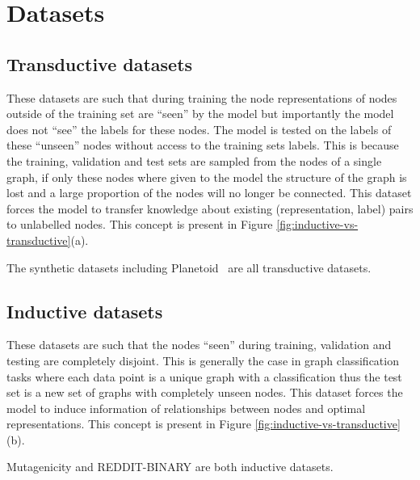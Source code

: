 \chapter{Datasets}
\label{app:datasets}


\section{Transductive datasets}
These datasets are such that during training the node representations of nodes outside of the training set are ``seen'' by the model but importantly the model does not ``see'' the labels for these nodes.
The model is tested on the labels of these ``unseen'' nodes without access to the training sets labels.
This is because the training, validation and test sets are sampled from the nodes of a single graph, if only these nodes where given to the model the structure of the graph is lost and a large proportion of the nodes will no longer be connected.
This dataset forces the model to transfer knowledge about existing (representation, label) pairs to unlabelled nodes.
This concept is present in Figure \ref{fig:inductive-vs-transductive}(a).

The synthetic datasets including Planetoid~\cite{planetoid} are all transductive datasets.

\section{Inductive datasets}
These datasets are such that the nodes ``seen'' during training, validation and testing are completely disjoint.
This is generally the case in graph classification tasks where each data point is a unique graph with a classification thus the test set is a new set of graphs with completely unseen nodes.
This dataset forces the model to induce information of relationships between nodes and optimal representations.
This concept is present in Figure \ref{fig:inductive-vs-transductive}(b).

Mutagenicity and REDDIT-BINARY are both inductive datasets.

